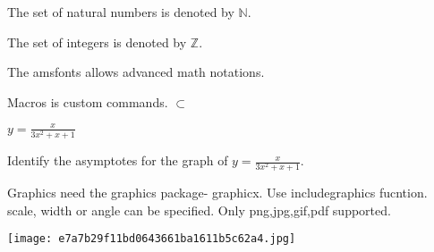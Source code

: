 \documentclass[11pt]{article}
\def\eq1{y=\frac{x}{3x^2+x+1}}
\begin{document}
The set of natural numbers is denoted by $\mathbb{N}$. 

The set of integers is denoted by $\mathbb{Z}$.

The amsfonts allows advanced math notations. 

Macros is custom commands. $\subset$

$\eq1$

Identify the asymptotes for the graph of $\eq1$.

Graphics need the graphics package- graphicx.
Use includegraphics fucntion. scale, width or angle can be specified.
Only png,jpg,gif,pdf supported.
\begin{center}
\texttt{[image: e7a7b29f11bd0643661ba1611b5c62a4.jpg]}
\end{center}
\end{document}
